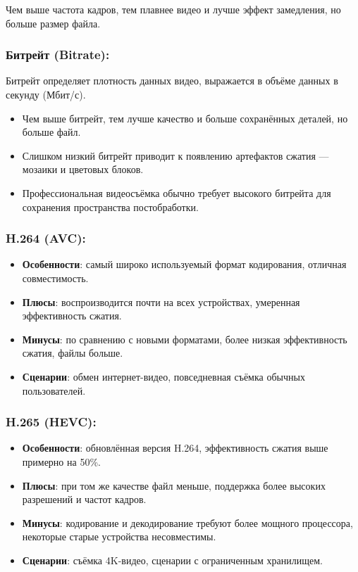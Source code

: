 Чем выше частота кадров, тем плавнее видео и лучше эффект замедления, но больше размер файла.

\subsubsection*{Битрейт (Bitrate):}

Битрейт определяет плотность данных видео, выражается в объёме данных в секунду (Мбит/с).

\begin{itemize}
  \item Чем выше битрейт, тем лучше качество и больше сохранённых деталей, но больше файл.
  \item Слишком низкий битрейт приводит к появлению артефактов сжатия — мозаики и цветовых блоков.
  \item Профессиональная видеосъёмка обычно требует высокого битрейта для сохранения пространства постобработки.
\end{itemize}


\subsubsection*{H.264 (AVC):}

\begin{itemize}
  \item \textbf{Особенности}: самый широко используемый формат кодирования, отличная совместимость.
  \item \textbf{Плюсы}: воспроизводится почти на всех устройствах, умеренная эффективность сжатия.
  \item \textbf{Минусы}: по сравнению с новыми форматами, более низкая эффективность сжатия, файлы больше.
  \item \textbf{Сценарии}: обмен интернет-видео, повседневная съёмка обычных пользователей.
\end{itemize}

\subsubsection*{H.265 (HEVC):}

\begin{itemize}
  \item \textbf{Особенности}: обновлённая версия H.264, эффективность сжатия выше примерно на 50\%.
  \item \textbf{Плюсы}: при том же качестве файл меньше, поддержка более высоких разрешений и частот кадров.
  \item \textbf{Минусы}: кодирование и декодирование требуют более мощного процессора, некоторые старые устройства несовместимы.
  \item \textbf{Сценарии}: съёмка 4K-видео, сценарии с ограниченным хранилищем.
\end{itemize}

